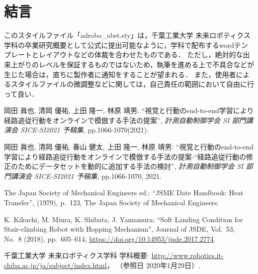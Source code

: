 \documentclass[10pt]{ujarticle}
\begin{document}
    \section{結\hspace{2zw}言}%
    このスタイルファイル「adrobo\_abst.sty」は，千葉工業大学 未来ロボティクス学科の卒業研究概要として公式に提出可能なように，学科で配布するwordテンプレートとレイアウトなどの体裁を合わせたものである．
    ただし，絶対的な出来上がりのレベルを保証するものではないため，執筆を進める上で不具合などが生じた場合は，直ちに製作者に通知をすることが望まれる．
    また，使用者によるスタイルファイルの微調整などに関しては，自己責任の範囲において自由に行って良い．
    
    \vspace{5truemm}
    {\footnotesize
        \begin{thebibliography}{99}
            
            岡田 眞也, 清岡 優祐, 上田 隆一, 林原 靖男: ``視覚と行動のend-to-end学習により経路追従行動をオンラインで模倣する手法の提案'', \textit{計測自動制御学会 SI 部門講演会 SICE-SI2021 予稿集}, pp.1066-1070(2021).

            岡田 眞也, 清岡 優祐, 春山 健太, 上田 隆一, 林原 靖男: ``視覚と行動のend-to-end学習により経路追従行動をオンラインで模倣する手法の提案-“経路追従行動の修正のためにデータセットを動的に追加する手法の検討'', \textit{計測自動制御学会 SI 部門講演会 SICE-SI2021 予稿集}, pp.1066-1070, 2021.
            
            The Japan Society of Mechanical Engineers ed.: ``JSME Date Handbook: Heat Transfer'', 
            (1979), p.~123, The Japan Society of Mechanical Engineers.
            
            K. Kikuchi, M. Miura, K. Shibata, J. Yamamura: ``Soft Landing Condition for Stair-climbing Robot with Hopping Mechanism'', 
            Journal of JSDE, Vol.~53, No.~8 (2018), pp.~605--614, \url{https://doi.org/10.14953/jjsde.2017.2774}.
            
            千葉工業大学 未来ロボティクス学科 学科概要: 
            \url{http://www.robotics.it-chiba.ac.jp/ja/subject/index.html}， 
            （参照日 2020年1月29日）. 
            
        \end{thebibliography}
    }
    \normalsize
    
\end{document}
